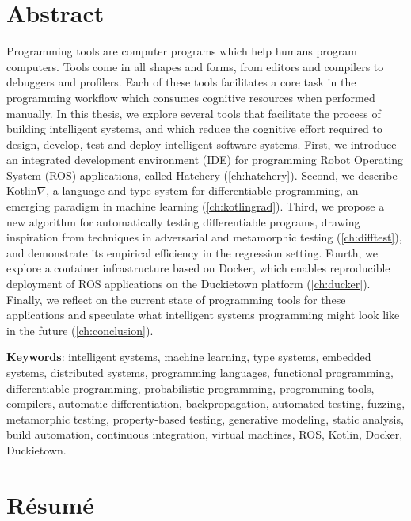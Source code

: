 \chapter*{Abstract}

Programming tools are computer programs which help humans program computers. Tools come in all shapes and forms, from editors and compilers to debuggers and profilers. Each of these tools facilitates a core task in the programming workflow which consumes cognitive resources when performed manually. In this thesis, we explore several tools that facilitate the process of building intelligent systems, and which reduce the cognitive effort required to design, develop, test and deploy intelligent software systems. First, we introduce an integrated development environment (IDE) for programming Robot Operating System (ROS) applications, called Hatchery (\autoref{ch:hatchery}). Second, we describe Kotlin$\nabla$, a language and type system for differentiable programming, an emerging paradigm in machine learning (\autoref{ch:kotlingrad}). Third, we propose a new algorithm for automatically testing differentiable programs, drawing inspiration from techniques in adversarial and metamorphic testing (\autoref{ch:difftest}), and demonstrate its empirical efficiency in the regression setting. Fourth, we explore a container infrastructure based on Docker, which enables reproducible deployment of ROS applications on the Duckietown platform (\autoref{ch:ducker}). Finally, we reflect on the current state of programming tools for these applications and speculate what intelligent systems programming might look like in the future (\autoref{ch:conclusion}).

\noindent\textbf{Keywords}: intelligent systems, machine learning, type systems, embedded systems, distributed systems, programming languages, functional programming, differentiable programming, probabilistic programming, programming tools, compilers, automatic differentiation, backpropagation, automated testing, fuzzing, metamorphic testing, property-based testing, generative modeling, static analysis, build automation, continuous integration, virtual machines, ROS, Kotlin, Docker, Duckietown.

\chapter*{R\'esum\'e}

